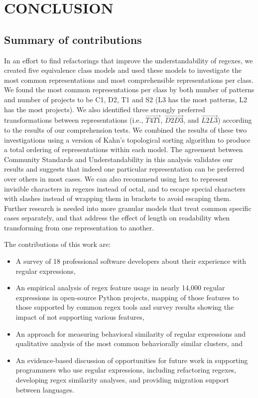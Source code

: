 \chapter{CONCLUSION}

\section{Summary of contributions}
In an effort to find refactorings that improve the understandability of regexes, we created five equivalence class models and used these models to investigate the most common representations and most comprehensible representations per class.  We found the most common representations per class by both number of patterns and number of projects to be C1, D2, T1 and S2 (L3 has the most patterns, L2 has the most projects).
We also identified three strongly preferred transformations between representations (i.e., $\overrightarrow{T4 T1}$, $\overrightarrow{D2 D3}$, and  $\overrightarrow{L2 L3}$) according to the results of our comprehension tests.  We combined the results of these two investigations using a version of Kahn's topological sorting algorithm to produce a total ordering of representations within each model.  The agreement between Community Standards and Understandability in this analysis validates our results and suggests that indeed one particular representation can be preferred over others in most cases.  We can also recommend using hex to represent invisible characters in regexes instead of octal, and to escape special characters with slashes instead of wrapping them in brackets to avoid escaping them.  Further research is needed into more granular models that treat common specific cases separately, and that address the effect of length on readability when transforming from one representation to another.


The contributions of this work are:
\begin{itemize} \setlength \itemsep{.1pt}
    \item A survey of 18 professional software developers about their experience with regular expressions,
    \item An empirical analysis of regex feature usage in nearly 14,000 regular expressions in  open-source Python projects, mapping of those features to those supported by common regex tools and survey results showing the impact of not supporting various features,
    \item An approach for measuring behavioral similarity of regular expressions and qualitative analysis of the most common behaviorally similar clusters, and
    \item An evidence-based discussion of opportunities for future work in supporting programmers who use regular expressions, including refactoring regexes, developing regex similarity analyses, and providing migration support between languages.
\end{itemize}
